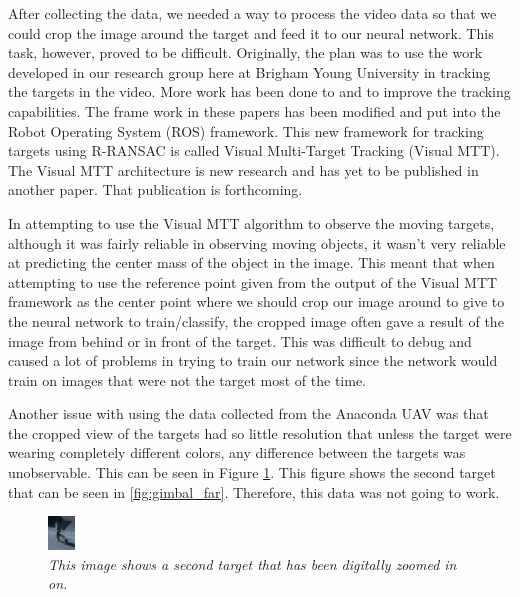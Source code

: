 \documentclass[letterpaper, 10 pt, conference]{ieeeconf}  %
\begin{document}
After collecting the data, we needed a way to process the video data so that we could crop the image around the target and feed it to our neural network. This task, however, proved to be difficult. Originally, the plan was to use the work developed in our research group here at Brigham Young University in tracking the targets in the video. More work has been done to \cite{ingersoll2015vision} and \cite{niedfeldt2014multiple} to improve the tracking capabilities. The frame work in these papers has been modified and put into the Robot Operating System (ROS) framework. This new framework for tracking targets using R-RANSAC is called Visual Multi-Target Tracking (Visual MTT). The Visual MTT architecture is new research and has yet to be published in another paper. That publication is forthcoming.

In attempting to use the Visual MTT algorithm to observe the moving targets, although it was fairly reliable in observing moving objects, it wasn't very reliable at predicting the center mass of the object in the image. This meant that when attempting to use the reference point given from the output of the Visual MTT framework as the center point where we should crop our image around to give to the neural network to train/classify, the cropped image often gave a result of the image from behind or in front of the target. This was difficult to debug and caused a lot of problems in trying to train our network since the network would train on images that were not the target most of the time. 

Another issue with using the data collected from the Anaconda UAV was that the cropped view of the targets had so little resolution that unless the target were wearing completely different colors, any difference between the targets was unobservable. This can be seen in Figure \ref{fig:gimbal_2}. This figure shows the second target that can be seen in \ref{fig:gimbal_far}. Therefore, this data was not going to work.

\begin{figure}
	\begin{center}
		\includegraphics[width=.45\textwidth]{gimbal_zoomed_2.png}
		\caption{\textit{This image shows a second target that has been digitally zoomed in on.}} 
		\label{fig:gimbal_2}
	\end{center}
\end{figure}
\end{document}
